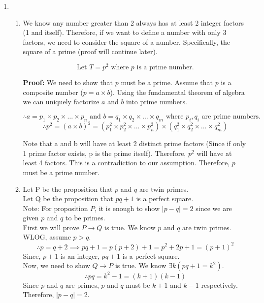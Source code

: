 \documentclass[a4paper]{article}
\begin{document}
    \begin{enumerate}
    \item \begin{enumerate}
        \item We know any number greater than 2 always has at least 2 integer factors (1 and itself). Therefore, if we want to define a number with only 3 factors, we need to consider the square of a number. Specifically, the square of a prime (proof will continue later).
        
        \[ \text{Let } T = p^2 \text{ where } p \text{ is a prime number.} \]

        \textbf{Proof:}
        We need to show that $p$ must be a prime. Assume that $p$ is a composite number ($p = a \times b$). Using the fundamental theorem of algebra we can uniquely factorize $a$ and $b$ into prime numbers. 

        \[\therefore a = p_1 \times p_2 \times \ldots \times p_n \text{ and } b = q_1 \times q_2 \times \ldots \times q_m \text{ where } p_i, q_i \text{ are prime numbers.}\]
        \[ \therefore p^2 = (a \times b)^2 = (p_1^2 \times p_2^2 \times \ldots \times p_n^2) \times (q_1^2 \times q_2^2 \times \ldots \times q_m^2) \]

        Note that a and b will have at least 2 distinct prime factors (Since if only 1 prime factor exists, p is the prime itself). Therefore, $p^2$ will have at least 4 factors. This is a contradiction to our assumption. Therefore, $p$ must be a prime number. \\

        \item Let P be the proposition that $p$ and $q$ are twin primes. \\
        Let Q be the proposition that $pq + 1$ is a perfect square. \\

        Note: For proposition $P$, it is enough to show $|p - q| = 2$ since we are given $p$ and $q$ to be primes. \\
    
        First we will prove $P \rightarrow Q$ is true. We know $p$ and $q$ are twin primes. WLOG, assume $p > q$.
        \[ \therefore p = q + 2 \implies pq + 1 = p(p + 2) + 1 = p^2 + 2p + 1 = (p + 1)^2 \]
        Since, $p + 1$ is an integer, $pq + 1$ is a perfect square. \\

        Now, we need to show $Q \rightarrow P$ is true. We know $\exists k (pq + 1 = k^2)$.
        \[ \therefore pq = k^2 - 1 = (k + 1)(k - 1) \]
        Since $p$ and $q$ are primes, $p$ and $q$ must be $k + 1$ and $k - 1$ respectively. Therefore, $|p - q| = 2$. \\



\end{enumerate}
\end{enumerate}
\end{document}
